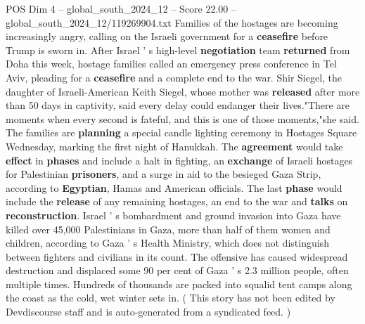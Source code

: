 \begin{textsample}{POS Dim 4 – global\_south\_2024\_12 – Score 22.00 – global\_south\_2024\_12/119269904.txt}
Families of the hostages are becoming increasingly angry, calling on the Israeli government for a \textbf{ceasefire} before Trump is sworn in.
After Israel ' s high-level \textbf{negotiation} team \textbf{returned} from Doha this week, hostage families called an emergency press conference in Tel Aviv, pleading for a \textbf{ceasefire} and a complete end to the war.
Shir Siegel, the daughter of Israeli-American Keith Siegel, whose mother was \textbf{released} after more than 50 days in captivity, said every delay could endanger their lives."There are moments when every second is fateful, and this is one of those moments,"she said.
The families are \textbf{planning} a special candle lighting ceremony in Hostages Square Wednesday, marking the first night of Hanukkah.
The \textbf{agreement} would take \textbf{effect} in \textbf{phases} and include a halt in fighting, an \textbf{exchange} of Israeli hostages for Palestinian \textbf{prisoners}, and a surge in aid to the besieged Gaza Strip, according to \textbf{Egyptian}, Hamas and American officials.
The last \textbf{phase} would include the \textbf{release} of any remaining hostages, an end to the war and \textbf{talks} on \textbf{reconstruction}.
Israel ' s bombardment and ground invasion into Gaza have killed over 45,000 Palestinians in Gaza, more than half of them women and children, according to Gaza ' s Health Ministry, which does not distinguish between fighters and civilians in its count.
The offensive has caused widespread destruction and displaced some 90 per cent of Gaza ' s 2.3 million people, often multiple times.
Hundreds of thousands are packed into squalid tent camps along the coast as the cold, wet winter sets in. ( This story has not been edited by Devdiscourse staff and is auto-generated from a syndicated feed. )

\end{textsample}
